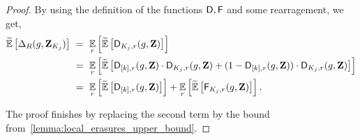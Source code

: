 	\begin{proof} By using the definition of the functions ${ \mathsf{D} }, { \mathsf{F} }$ and some rearragement, we get,
	\begin{align*}
		\tildeEx{\Delta_R(g,\zee_{K_j})} ~&=~ \Ex{\ri}{\tildeEx{\dd_{K_j,\ri}(g,\zee)}} \\
		~&=~ \Ex{\ri}{\tildeEx{\dd_{[k],\ri}(g,\zee) \cdot \dd_{K_j,\ri}(g,\zee) + (1-\dd_{[k],\ri}(g,\zee)) \cdot \dd_{K_j,\ri}(g,\zee)}} \\
		~&=~ \Ex{\ri}{\tildeEx{\dd_{[k],\ri}(g,\zee)}} + \Ex{\ri}{\tildeEx{\fd_{K_j,\ri}(g,\zee)}}.
	\end{align*}
	
The proof finishes by replacing the second term by the bound from~\cref{lemma:local_erasures_upper_bound}.
%	
\end{proof}


